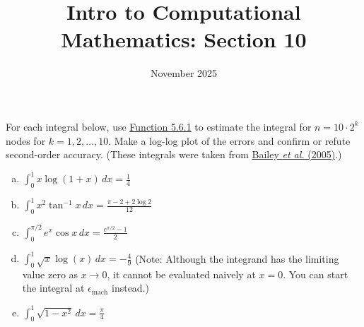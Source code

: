 \documentclass[11pt]{article}
\title{Intro to Computational Mathematics: Section 10}
\date{November 2025}
\newenvironment{problem}[2][Question]{\begin{trivlist}
\item[\hskip \labelsep {\bfseries #1}\hskip \labelsep {\bfseries #2.}]}{\end{trivlist}}
\theoremstyle{definition}
\begin{document}
\maketitle

\begin{problem}{5.6.1}
For each integral below, use \href{https://fncbook.com/integration/#function-trapezoid}{Function 5.6.1} to estimate the integral for $n = 10 \cdot 2^k$ nodes for $k = 1, 2, \ldots, 10$. Make a log-log plot of the errors and confirm or refute second-order accuracy. (These integrals were taken from \href{https://doi.org/10.1080/10586458.2005.10128931}{Bailey \textit{et al.} (2005)}.)
\begin{enumerate}[(a)]
    \item $\int_0^1 x\log(1 + x)\, dx = \frac{1}{4}$
    \item $\int_0^1 x^2 \tan^{-1}x \, dx = \frac{\pi - 2 + 2\log 2}{12}$
    \item $\int_0^{\pi/2} e^x \cos x \, dx = \frac{e^{\pi/2} - 1}{2}$
    \item $\int_0^1 \sqrt{x}\log(x) \, dx = - \frac{4}{9}$ (Note: Although the integrand has the limiting value zero as $x \rightarrow 0$, it cannot be evaluated naively at $x = 0$. You can start the integral at $\epsilon_{\text{mach}}$ instead.)
    \item $\int_0^1 \sqrt{1 - x^2} \, dx = \frac{\pi}{4}$
\end{enumerate}
\end{problem}
\end{document}
